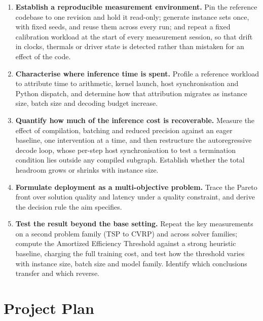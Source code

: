 \documentclass[11pt,a4paper]{article}
\begin{document}
\begin{enumerate}[label=\textbf{O\arabic*.},leftmargin=2.6em]

\item \textbf{Establish a reproducible measurement environment.} Pin the
reference codebase to one revision and hold it read-only; generate instance sets
once, with fixed seeds, and reuse them across every run; and repeat a fixed
calibration workload at the start of every measurement session, so that drift in
clocks, thermals or driver state is detected rather than mistaken for an effect
of the code.

\item \textbf{Characterise where inference time is spent.} Profile a reference
workload to attribute time to arithmetic, kernel launch, host synchronisation and
Python dispatch, and determine how that attribution migrates as instance size,
batch size and decoding budget increase.

\item \textbf{Quantify how much of the inference cost is recoverable.} Measure the
effect of compilation, batching and reduced precision against an eager baseline,
one intervention at a time, and then restructure the autoregressive decode loop,
whose per-step host synchronisation to test a termination condition lies outside
any compiled subgraph. Establish whether the total headroom grows or shrinks with
instance size.

\item \textbf{Formulate deployment as a multi-objective problem.} Trace the
Pareto front over solution quality and latency under a quality constraint, and
derive the decision rule the aim specifies.

\item \textbf{Test the result beyond the base setting.} Repeat the key
measurements on a second problem family (TSP to CVRP) and across solver families;
compute the Amortized Efficiency Threshold against a strong heuristic baseline,
charging the full training cost, and test how the threshold varies with instance
size, batch size and model family. Identify which conclusions transfer and which
reverse.

\end{enumerate}

\section{Project Plan}
\end{document}
